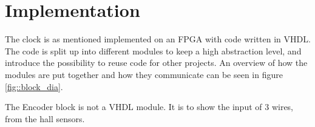 \section{Implementation}
The clock is as mentioned implemented on an FPGA with code written in VHDL.
The code is split up into different modules to keep a high abstraction level, and introduce the possibility to reuse code for other projects.
An overview of how the modules are put together and how they communicate can be seen in figure \ref{fig::block_dia}.


The Encoder block is not a VHDL module.
It is to show the input of 3 wires, from the hall sensors.